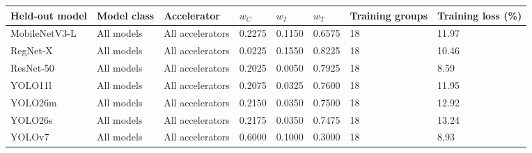 \begin{tabular}{@{}llllllll@{}}
\toprule
Held-out model & Model class & Accelerator & $w_C$ & $w_I$ & $w_T$ & Training groups & Training loss (\%) \\
\midrule
MobileNetV3-L & All models & All accelerators & 0.2275 & 0.1150 & 0.6575 & 18 & 11.97 \\
RegNet-X & All models & All accelerators & 0.0225 & 0.1550 & 0.8225 & 18 & 10.46 \\
ResNet-50 & All models & All accelerators & 0.2025 & 0.0050 & 0.7925 & 18 & 8.59 \\
YOLO11l & All models & All accelerators & 0.2075 & 0.0325 & 0.7600 & 18 & 11.95 \\
YOLO26m & All models & All accelerators & 0.2150 & 0.0350 & 0.7500 & 18 & 12.92 \\
YOLO26s & All models & All accelerators & 0.2175 & 0.0350 & 0.7475 & 18 & 13.24 \\
YOLOv7 & All models & All accelerators & 0.6000 & 0.1000 & 0.3000 & 18 & 8.93 \\
\bottomrule
\end{tabular}
